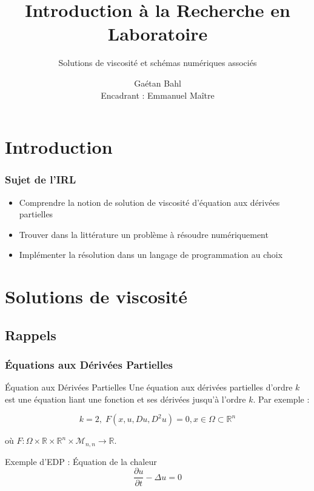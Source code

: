 \documentclass[10pt]{beamer}
\title{Introduction à la Recherche en Laboratoire }
\subtitle{Solutions de viscosité et schémas numériques associés}
\author{Gaétan Bahl \\ Encadrant : Emmanuel Maître}\institute{Grenoble INP Ensimag \\ Laboratoire Jean Kuntzmann -- Équipe EDP}
\begin{document}
\begin{frame}
\titlepage
\end{frame}

\section{Introduction}
\begin{frame}
\frametitle{Sujet de l'IRL}

\begin{itemize}
\item Comprendre la notion de solution de viscosité d'équation aux dérivées partielles

\item Trouver dans la littérature un problème à résoudre numériquement

\item Implémenter la résolution dans un langage de programmation au choix 
\end{itemize}

\end{frame}

\section{Solutions de viscosité}

\subsection{Rappels}
\begin{frame}

\frametitle{Équations aux Dérivées Partielles}

\begin{block}{Équation aux Dérivées Partielles}
Une équation aux dérivées partielles d'ordre $k$ est une équation liant une fonction
et ses dérivées jusqu'à l'ordre $k$. Par exemple :

$$k=2, \;  F(x,u,Du,D^2u) = 0, x\in \Omega \subset \mathbb{R}^n $$

où $F : \Omega \times \mathbb{R} \times \mathbb{R}^n \times \mathcal{M}_{n,n} \to \mathbb{R}$.
\end{block}

\begin{block}{Exemple d'EDP : Équation de la chaleur}
$$\frac{\partial u}{\partial t} - \Delta u = 0$$
\end{block}

\end{frame}
\end{document}
